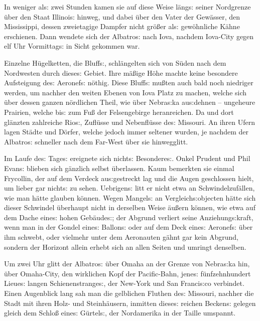 \documentclass[oneside,12pt]{book}
\newcommand{\s}{s:}
\begin{document}
In weniger al{\s} zwei Stunden kamen sie auf diese Weise l\"ang{\s}
seiner Nordgrenze \"uber den Staat Illinoi{\s} hinweg, und dabei
\"uber den Vater der Gew\"asser, den Mississippi, dessen zweietagige
Dampfer nicht gr\"o{\ss}er al{\s} gew\"ohnliche K\"ahne erschienen.
Dann wendete sich der {\glqq}Albatro{\s}{\grqq} nach Iova, nachdem
Iova-City gegen elf Uhr Vormittag{\s} in Sicht gekommen war.

Einzelne H\"ugelketten, die {\glqq}Bluff{\s}{\grqq}, schl\"angelten
sich von S\"uden nach dem Nordwesten durch diese{\s} Gebiet. Ihre
m\"a{\ss}ige H\"ohe machte keine besondere Aufsteigung de{\s}
Aeronef{\s} n\"othig. Diese Bluff{\s} mu{\ss}ten auch bald noch
niedriger werden, um nachher den weiten Ebenen von Iova Platz zu
machen, welche sich \"uber dessen ganzen n\"ordlichen Theil, wie
\"uber Nebra{\s}ka au{\s}dehnen -- ungeheure Prairien, welche bi{\s}
zum Fu{\ss} der Felsengebirge heranreichen. Da und dort gl\"anzten
zahlreiche Rio{\s}, Zufl\"usse und Nebenfl\"usse de{\s} Missouri. An
ihren Ufern lagen St\"adte und D\"orfer, welche jedoch immer seltener
wurden, je nachdem der {\glqq}Albatro{\s}{\grqq} schneller nach dem
Far-West \"uber sie hinwegglitt.

Im Laufe de{\s} Tage{\s} ereignete sich nicht{\s} Besondere{\s}.
Onkel Prudent und Phil Evan{\s} blieben sich g\"anzlich selbst
\"uberlassen. Kaum bemerkten sie einmal Frycollin, der auf dem
Verdeck au{\s}gestreckt lag und die Augen geschlossen hielt, um
lieber gar nicht{\s} zu sehen. Uebrigen{\s} litt er nicht etwa an
Schwindelzuf\"allen, wie man h\"atte glauben k\"onnen. Wegen
Mangel{\s} an Vergleich{\s}objecten h\"atte sich dieser Schwindel
\"uberhaupt nicht in derselben Weise \"au{\ss}ern k\"onnen, wie etwa
auf dem Dache eine{\s} hohen Geb\"aude{\s}; der Abgrund verliert
seine Anziehung{\s}kraft, wenn man in der Gondel eine{\s} Ballon{\s}
oder auf dem Deck eine{\s} Aeronef{\s} \"uber ihm schwebt, oder
vielmehr unter dem Aeronauten g\"ahnt gar kein Abgrund, sondern der
Horizont allein erhebt sich an allen Seiten und umringt denselben.

Um zwei Uhr glitt der {\glqq}Albatro{\s}{\grqq} \"uber Omaha an der
Grenze von Nebra{\s}ka hin, \"uber Omaha-City, den wirklichen Kopf
der Pacific-Bahn, jene{\s} f\"unfzehnhundert Lieue{\s} langen
Schienenstrange{\s}, der New-York und San Franci{\s}co verbindet.
Einen Augenblick lang sah man die gelblichen Fluthen de{\s} Missouri,
nachher die Stadt mit ihren Holz- und Steinh\"ausern, inmitten
diese{\s} reichen Becken{\s} gelegen gleich dem Schlo{\ss} eine{\s}
G\"urtel{\s}, der Nordamerika in der Taille umspannt.
\end{document}
